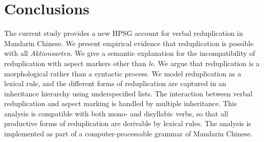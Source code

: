 \section{Conclusions}\label{sec:conclu}

The current study provides a new HPSG account for verbal reduplication in Mandarin Chinese.
We present empirical evidence that reduplication is possible with all \textit{Aktionsarten}.
We give a semantic explanation for the incompatibility of reduplication with aspect markers other than \textit{le}.
We argue that reduplication is a morphological rather than a syntactic process.
We model reduplication as a lexical rule,
and the different forms of reduplication are captured in an inheritance hierarchy using underspecified lists.
The interaction between verbal reduplication and aspect marking is handled by multiple inheritance.
This analysis is compatible with both mono- and disyllabic verbs, 
so that all productive forms of reduplication are derivable by lexical rules.
The analysis is implemented as part of a computer-processable grammar of Mandarin Chinese.

